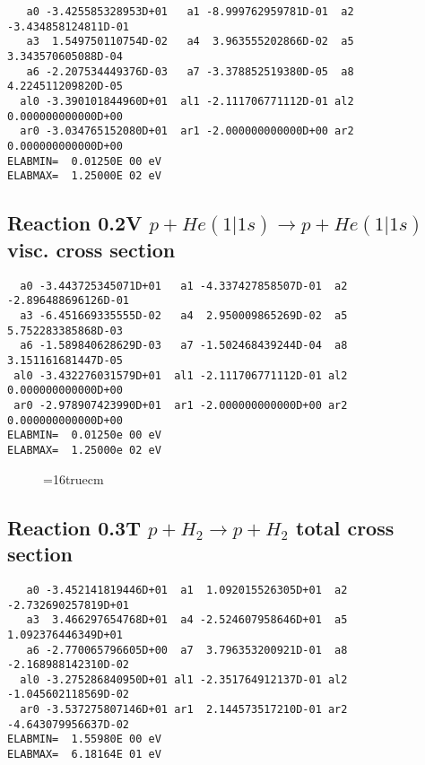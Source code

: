 \documentclass[12pt]{article}
\begin{document}
\begin{small}\begin{verbatim}
   a0 -3.425585328953D+01   a1 -8.999762959781D-01  a2 -3.434858124811D-01
   a3  1.549750110754D-02   a4  3.963555202866D-02  a5  3.343570605088D-04
   a6 -2.207534449376D-03   a7 -3.378852519380D-05  a8  4.224511209820D-05
  al0 -3.390101844960D+01  al1 -2.111706771112D-01 al2  0.000000000000D+00
  ar0 -3.034765152080D+01  ar1 -2.000000000000D+00 ar2  0.000000000000D+00
ELABMIN=  0.01250E 00 eV
ELABMAX=  1.25000E 02 eV
\end{verbatim}\end{small}


\subsection{
Reaction 0.2V   $ p + He(1|1s) \rightarrow p + He (1|1s) $ visc. cross
section }


\begin{small}\begin{verbatim}
  a0 -3.443725345071D+01   a1 -4.337427858507D-01  a2 -2.896488696126D-01
  a3 -6.451669335555D-02   a4  2.950009865269D-02  a5  5.752283385868D-03
  a6 -1.589840628629D-03   a7 -1.502468439244D-04  a8  3.151161681447D-05
 al0 -3.432276031579D+01  al1 -2.111706771112D-01 al2  0.000000000000D+00
 ar0 -2.978907423990D+01  ar1 -2.000000000000D+00 ar2  0.000000000000D+00
ELABMIN=  0.01250e 00 eV
ELABMAX=  1.25000e 02 eV
\end{verbatim}\end{small}


\begin{figure} \label{0.2}
\epsfxsize=16truecm
\end{figure}
\newpage

\subsection{
Reaction 0.3T    $p + H_2 \rightarrow p + H_2 $  total cross section
}


\begin{small}\begin{verbatim}
   a0 -3.452141819446D+01  a1  1.092015526305D+01  a2 -2.732690257819D+01
   a3  3.466297654768D+01  a4 -2.524607958646D+01  a5  1.092376446349D+01
   a6 -2.770065796605D+00  a7  3.796353200921D-01  a8 -2.168988142310D-02
  al0 -3.275286840950D+01 al1 -2.351764912137D-01 al2 -1.045602118569D-02
  ar0 -3.537275807146D+01 ar1  2.144573517210D-01 ar2 -4.643079956637D-02
ELABMIN=  1.55980E 00 eV
ELABMAX=  6.18164E 01 eV
\end{verbatim}\end{small}
\end{document}

